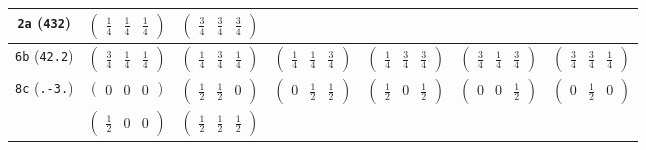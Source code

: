 \documentclass[fleqn,9pt,landscape]{jsarticle}
\begin{document}
\begin{center}
\begin{longtable}{ccccccc}
{\tt 2a} ({\tt 432}) & $ \begin{pmatrix} \frac{1}{4} & \frac{1}{4} & \frac{1}{4} \end{pmatrix} $ & $ \begin{pmatrix} \frac{3}{4} & \frac{3}{4} & \frac{3}{4} \end{pmatrix} $ & $  $ & $  $ & $  $ & $  $ \\ \hline
{\tt 6b} ({\tt 42.2}) & $ \begin{pmatrix} \frac{3}{4} & \frac{1}{4} & \frac{1}{4} \end{pmatrix} $ & $ \begin{pmatrix} \frac{1}{4} & \frac{3}{4} & \frac{1}{4} \end{pmatrix} $ & $ \begin{pmatrix} \frac{1}{4} & \frac{1}{4} & \frac{3}{4} \end{pmatrix} $ & $ \begin{pmatrix} \frac{1}{4} & \frac{3}{4} & \frac{3}{4} \end{pmatrix} $ & $ \begin{pmatrix} \frac{3}{4} & \frac{1}{4} & \frac{3}{4} \end{pmatrix} $ & $ \begin{pmatrix} \frac{3}{4} & \frac{3}{4} & \frac{1}{4} \end{pmatrix} $ \\ \hline
{\tt 8c} ({\tt .-3.}) & $ \begin{pmatrix} 0 & 0 & 0 \end{pmatrix} $ & $ \begin{pmatrix} \frac{1}{2} & \frac{1}{2} & 0 \end{pmatrix} $ & $ \begin{pmatrix} 0 & \frac{1}{2} & \frac{1}{2} \end{pmatrix} $ & $ \begin{pmatrix} \frac{1}{2} & 0 & \frac{1}{2} \end{pmatrix} $ & $ \begin{pmatrix} 0 & 0 & \frac{1}{2} \end{pmatrix} $ & $ \begin{pmatrix} 0 & \frac{1}{2} & 0 \end{pmatrix} $ \\
& $ \begin{pmatrix} \frac{1}{2} & 0 & 0 \end{pmatrix} $ & $ \begin{pmatrix} \frac{1}{2} & \frac{1}{2} & \frac{1}{2} \end{pmatrix} $ & $  $ & $  $ & $  $ & $  $ \\ \hline

\end{longtable}
\end{center}
\end{document}
